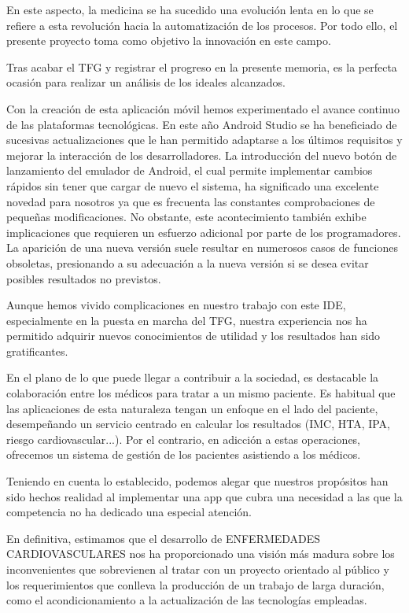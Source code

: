\documentclass[11pt,spanish,
		listoftables,listoffigures]
		{tfgplantilla}
\begin{document}
En este aspecto, la medicina se ha sucedido una evolución lenta en lo que se refiere a esta revolución hacia la automatización de los procesos. Por todo ello, el presente proyecto toma como objetivo la innovación en este campo.

Tras acabar el TFG y registrar el progreso en la presente memoria, es la perfecta ocasión para realizar un análisis de los ideales alcanzados.

Con la creación de esta aplicación móvil hemos experimentado el avance continuo de las plataformas tecnológicas. En este año Android Studio se ha beneficiado de sucesivas actualizaciones que le han permitido adaptarse a los últimos requisitos y mejorar la interacción de los desarrolladores. La introducción del nuevo botón de lanzamiento del emulador de Android, el cual permite implementar cambios rápidos sin tener que cargar de nuevo el sistema, ha significado una excelente novedad para nosotros ya que es frecuenta las constantes comprobaciones de pequeñas modificaciones. No obstante, este acontecimiento también exhibe implicaciones que requieren un esfuerzo adicional por parte de los programadores. La aparición de una nueva versión suele resultar en numerosos casos de funciones obsoletas, presionando a su adecuación a la nueva versión si se desea evitar posibles resultados no previstos.

Aunque hemos vivido complicaciones en nuestro trabajo con este IDE, especialmente en la puesta en marcha del TFG, nuestra experiencia nos ha permitido adquirir nuevos conocimientos de utilidad y los resultados han sido gratificantes. 

En el plano de lo que puede llegar a contribuir a la sociedad, es destacable la colaboración entre los médicos para tratar a un mismo paciente. Es habitual que las aplicaciones de esta naturaleza tengan un enfoque en el lado del paciente, desempeñando un servicio centrado en calcular los resultados (IMC, HTA, IPA, riesgo cardiovascular...). Por el contrario, en adicción a estas operaciones, ofrecemos un sistema de gestión de los pacientes asistiendo a los médicos.

Teniendo en cuenta lo establecido, podemos alegar que nuestros propósitos han sido hechos realidad al implementar una app que cubra una necesidad a las que la competencia no ha dedicado una especial atención.

En definitiva, estimamos que el desarrollo de \MakeUppercase{Enfermedades Cardiovasculares} nos ha proporcionado una visión más madura sobre los inconvenientes que sobrevienen al tratar con un proyecto orientado al público y los requerimientos que conlleva la producción de un trabajo de larga duración, como el acondicionamiento a la actualización de las tecnologías empleadas.
\end{document}
